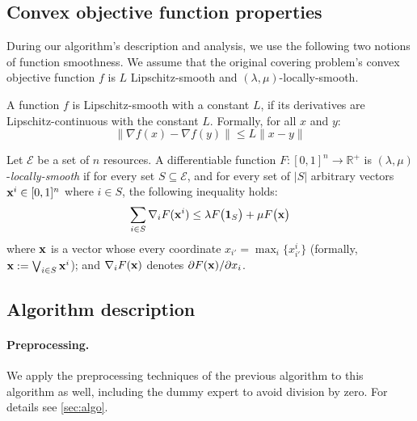 \subsection{Convex objective function properties} \label{sec:f-properties}

During our algorithm's description and analysis, we use the following two notions of function smoothness. We assume that the original covering problem's convex objective function $f$ is $L$ Lipschitz-smooth and $(\lambda, \mu)$-locally-smooth.

\begin{definition}
    A function $f$ is Lipschitz-smooth with a constant $L$, if its derivatives are Lipschitz-continuous with the constant $L$. Formally, for all $x$ and $y$:
    \[\|\nabla f(x) - \nabla f(y)\| \le L \|x - y\|\]
\end{definition}

\begin{definition}
    Let $\mathcal{E}$ be a set of $n$ resources.
    A differentiable function $F: [0,1]^{n} \rightarrow \mathbb{R}^{+}$ is $(\lambda,\mu)$-\emph{locally-smooth}
    if for every set $S \subseteq \mathcal{E}$, and for every set of $|S|$ arbitrary vectors $\mathbf{x}^{i} \in [0,1]^{n}$ where $i \in S$, the following inequality holds:
    \begin{equation*}	\label{eq:min-local-smooth}
    \sum_{i \in S} \nabla_{i} F(\mathbf{x}^{i}) \leq \lambda F\bigl( \mathbf{1}_{S} \bigr) + \mu F\bigl( \mathbf{x} \bigr)
    \end{equation*}
    where $\mathbf{x}$ is a vector whose every coordinate $x_{i'} = \max_{i}\{x^{i}_{i'}\}$ (formally, $\mathbf{x} := \bigvee_{i \in S} \mathbf{x}^{i}$);
    and $\nabla_{i} F(\mathbf{x})$ denotes $\partial F(\mathbf{x})/\partial x_{i}$.
\end{definition}

\subsection{Algorithm description}

\paragraph{Preprocessing.} We apply the preprocessing techniques of the previous algorithm to this algorithm as well, including the dummy expert to avoid division by zero. For details see \cref{sec:algo}.

